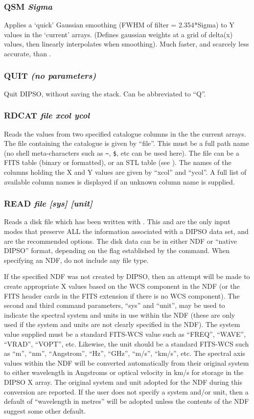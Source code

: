 \documentclass[twoside,11pt,noabs,nolof]{starlink}
\providecommand{\dipcom}[3]{\subsubsection*{\label{COM:#1}\textbf{#1} \emph{#2}}}
\begin{document}
\dipcom{QSM}{Sigma}{Applies a 'quick' Gaussian smoothing to an array}
Applies a `quick' Gaussian smoothing (FWHM of filter = 2.354*Sigma) to
Y values in the `current' arrays. (Defines gaussian weights at a grid
of delta(x) values, then linearly interpolates when smoothing). Much
faster, and scarcely less accurate, than .

\dipcom{QUIT}{(no parameters)}{Quit}
Quit DIPSO, without saving the stack. Can be abbreviated to ``Q''.

\dipcom{RDCAT}{file xcol ycol}{Reads X and Y values from a catalogue into
the current arrays}
Reads the values from two specified catalogue columns in the the current
arrays. The file containing the catalogue is given by ``file''. This must
be a full path name (no shell meta-characters such as \verb+~+, \verb+$+,
etc can be used here). The file can be a FITS table (binary or formatted),
or an STL table (see  ). The names of the columns
holding the X and Y values are given by ``xcol'' and ``ycol''. A full list
of available column names is displayed if an unknown column name is supplied.

\dipcom{READ}{file [sys] [unit]}{Reads data from a disk file to the current arrays (see {\texttt{WRITE}})}
Reads a disk file which has been written with
.  This and 
are the
only input modes that preserve ALL the information associated with a DIPSO
data set, and are the recommended options. The disk data can be in either NDF or
``native DIPSO'' format, depending on the flag established by the 
command. When specifying an NDF, do not include any file type.

If the specified NDF was not created by DIPSO, then an attempt will be
made to create appropriate X values based on the WCS component in the
NDF (or the FITS header cards in the FITS extension if there is no WCS
component). The second and third command parameters, ``sys'' and ``unit'',
may be used to indicate the spectral system and units in use within the NDF
(these are only used if the system and units are not clearly specified in
the NDF). The system value supplied must be a standard FITS-WCS value such as
``FREQ'', ``WAVE'', ``VRAD'', ``VOPT'', etc. Likewise, the unit should be
a standard FITS-WCS such as ``m'', ``nm'', ``Angstrom'', ``Hz'', ``GHz'',
``m/s'', ``km/s'', etc. The spectral axis values within the NDF will be
converted automatically from their original system to either wavelength in
Angstroms or optical velocity in km/s for storage in the DIPSO X array. The
original system and unit adopted for the NDF during this conversion are
reported. If the user does not specify a system and/or unit, then a
default of ``wavelength in metres'' will be adopted unless the contents
of the NDF suggest some other default.
\end{document}
